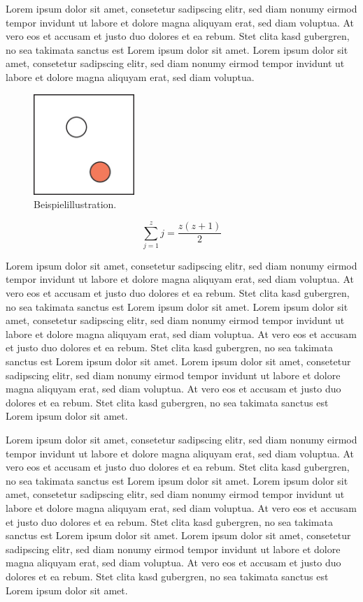 \documentclass[journal]{vgtc}
\begin{document}
Lorem ipsum dolor sit amet, consetetur sadipscing elitr, sed diam
nonumy eirmod tempor invidunt ut labore et dolore magna aliquyam erat,
sed diam voluptua. At vero eos et accusam et justo duo dolores et ea
rebum. Stet clita kasd gubergren, no sea takimata sanctus est Lorem
ipsum dolor sit amet. Lorem ipsum dolor sit amet, consetetur
sadipscing elitr, sed diam nonumy eirmod tempor invidunt ut labore et
dolore magna aliquyam erat, sed diam voluptua.


\begin{figure}[tb]
  \centering
  \includegraphics[width=1.5in]{sample}
  \caption{\label{fig:sample} Beispielillustration.}
\end{figure}

\begin{equation}
  \sum_{j=1}^{z} j = \frac{z(z+1)}{2}
\end{equation}

Lorem ipsum dolor sit amet, consetetur sadipscing elitr, sed diam
nonumy eirmod tempor invidunt ut labore et dolore magna aliquyam erat,
sed diam voluptua. At vero eos et accusam et justo duo dolores et ea
rebum. Stet clita kasd gubergren, no sea takimata sanctus est Lorem
ipsum dolor sit amet. Lorem ipsum dolor sit amet, consetetur
sadipscing elitr, sed diam nonumy eirmod tempor invidunt ut labore et
dolore magna aliquyam erat, sed diam voluptua. At vero eos et accusam
et justo duo dolores et ea rebum. Stet clita kasd gubergren, no sea
takimata sanctus est Lorem ipsum dolor sit amet. Lorem ipsum dolor sit
amet, consetetur sadipscing elitr, sed diam nonumy eirmod tempor
invidunt ut labore et dolore magna aliquyam erat, sed diam
voluptua. At vero eos et accusam et justo duo dolores et ea
rebum. Stet clita kasd gubergren, no sea takimata sanctus est Lorem
ipsum dolor sit amet.

Lorem ipsum dolor sit amet, consetetur sadipscing elitr, sed diam
nonumy eirmod tempor invidunt ut labore et dolore magna aliquyam erat,
sed diam voluptua. At vero eos et accusam et justo duo dolores et ea
rebum. Stet clita kasd gubergren, no sea takimata sanctus est Lorem
ipsum dolor sit amet. Lorem ipsum dolor sit amet, consetetur
sadipscing elitr, sed diam nonumy eirmod tempor invidunt ut labore et
dolore magna aliquyam erat, sed diam voluptua. At vero eos et accusam
et justo duo dolores et ea rebum. Stet clita kasd gubergren, no sea
takimata sanctus est Lorem ipsum dolor sit amet. Lorem ipsum dolor sit
amet, consetetur sadipscing elitr, sed diam nonumy eirmod tempor
invidunt ut labore et dolore magna aliquyam erat, sed diam
voluptua. At vero eos et accusam et justo duo dolores et ea
rebum. Stet clita kasd gubergren, no sea takimata sanctus est Lorem
ipsum dolor sit amet.
\end{document}
